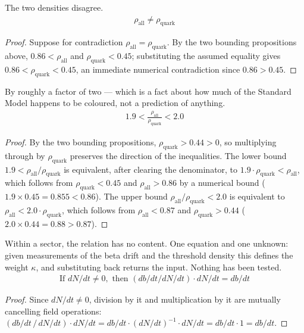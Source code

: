 \begin{theorem}
The two densities disagree.
\begin{align*}
\rho_{\text{all}} \neq \rho_{\text{quark}}
\end{align*}
\begin{proof}
Suppose for contradiction $\rho_{\text{all}}=\rho_{\text{quark}}$. By the two bounding propositions above, $0.86 < \rho_{\text{all}}$ and $\rho_{\text{quark}} < 0.45$; substituting the assumed equality gives $0.86 < \rho_{\text{quark}} < 0.45$, an immediate numerical contradiction since $0.86 > 0.45$.
\end{proof}
\end{theorem}

\begin{theorem}
By roughly a factor of two — which is a fact about how much of the Standard Model happens to be coloured, not a prediction of anything.
\begin{align*}
1.9 < \frac{\rho_{\text{all}}}{\rho_{\text{quark}}} < 2.0
\end{align*}
\begin{proof}
By the two bounding propositions, $\rho_{\text{quark}}>0.44>0$, so multiplying through by $\rho_{\text{quark}}$ preserves the direction of the inequalities. The lower bound $1.9<\rho_{\text{all}}/\rho_{\text{quark}}$ is equivalent, after clearing the denominator, to $1.9\cdot\rho_{\text{quark}}<\rho_{\text{all}}$, which follows from $\rho_{\text{quark}}<0.45$ and $\rho_{\text{all}}>0.86$ by a numerical bound ($1.9\times0.45=0.855<0.86$). The upper bound $\rho_{\text{all}}/\rho_{\text{quark}}<2.0$ is equivalent to $\rho_{\text{all}}<2.0\cdot\rho_{\text{quark}}$, which follows from $\rho_{\text{all}}<0.87$ and $\rho_{\text{quark}}>0.44$ ($2.0\times0.44=0.88>0.87$).
\end{proof}
\end{theorem}

\begin{theorem}
Within a sector, the relation has no content.  One equation and one unknown: given measurements of the beta drift and the threshold density this defines the weight $\kappa$, and substituting back returns the input.  Nothing has been tested.
\begin{align*}
\text{If } dN/dt \neq 0, \text{ then } (db/dt / dN/dt) \cdot dN/dt = db/dt
\end{align*}
\begin{proof}
Since $dN/dt\neq0$, division by it and multiplication by it are mutually cancelling field operations: $(db/dt \,/\, dN/dt)\cdot dN/dt = db/dt \cdot (dN/dt)^{-1}\cdot dN/dt = db/dt\cdot 1 = db/dt$.
\end{proof}
\end{theorem}

